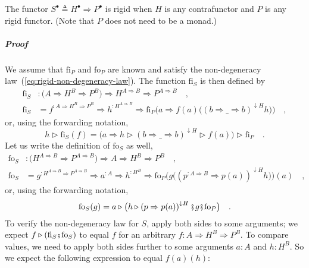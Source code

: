 The functor $S^{\bullet}\triangleq H^{\bullet}\Rightarrow P^{\bullet}$
is rigid when $H$ is any contrafunctor and $P$ is any rigid functor.
(Note that $P$ does not need to be a monad.)

\subparagraph{Proof}

We assume that $\text{fi}_{P}$ and $\text{fo}_{P}$ are known and
satisfy the non-degeneracy law~(\ref{eq:rigid-non-degeneracy-law}).
The function $\text{fi}_{S}$ is then defined by
\begin{align*}
\text{fi}_{S} & :\big(A\Rightarrow H^{B}\Rightarrow P^{B}\big)\Rightarrow H^{A\Rightarrow B}\Rightarrow P^{A\Rightarrow B}\quad,\\
\text{fi}_{S} & =f^{:A\Rightarrow H^{B}\Rightarrow P^{B}}\Rightarrow h^{:H^{A\Rightarrow B}}\Rightarrow\text{fi}_{P}\big(a\Rightarrow f(a)\big(\left(b\Rightarrow\_\Rightarrow b\right)^{\downarrow H}h\big)\big)\quad,
\end{align*}
or, using the forwarding notation,
\[
h\triangleright\text{fi}_{S}(f)=\big(a\Rightarrow h\triangleright\left(b\Rightarrow\_\Rightarrow b\right)^{\downarrow H}\triangleright f(a)\big)\triangleright\text{fi}_{P}\quad.
\]
Let us write the definition of $\text{fo}_{S}$ as well,
\begin{align*}
\text{fo}_{S} & :\big(H^{A\Rightarrow B}\Rightarrow P^{A\Rightarrow B}\big)\Rightarrow A\Rightarrow H^{B}\Rightarrow P^{B}\quad,\\
\text{fo}_{S} & =g^{:H^{A\Rightarrow B}\Rightarrow P^{A\Rightarrow B}}\Rightarrow a^{:A}\Rightarrow h^{:H^{B}}\Rightarrow\text{fo}_{P}\bigg(g\big(\left(p^{:A\Rightarrow B}\Rightarrow p(a)\right)^{\downarrow H}h\big)\bigg)(a)\quad,
\end{align*}
or, using the forwarding notation,
\[
\text{fo}_{S}(g)=a\triangleright\big(h\triangleright\left(p\Rightarrow p(a)\right)^{\downarrow H}\bef g\bef\text{fo}_{P}\big)\quad.
\]
To verify the non-degeneracy law for $S$, apply both sides to some
arguments; we expect $f\triangleright(\text{fi}_{S}\bef\text{fo}_{S})$
to equal $f$ for an arbitrary $f:A\Rightarrow H^{B}\Rightarrow P^{B}$.
To compare values, we need to apply both sides further to some arguments
$a:A$ and $h:H^{B}$. So we expect the following expression to equal
$f(a)(h)$:
